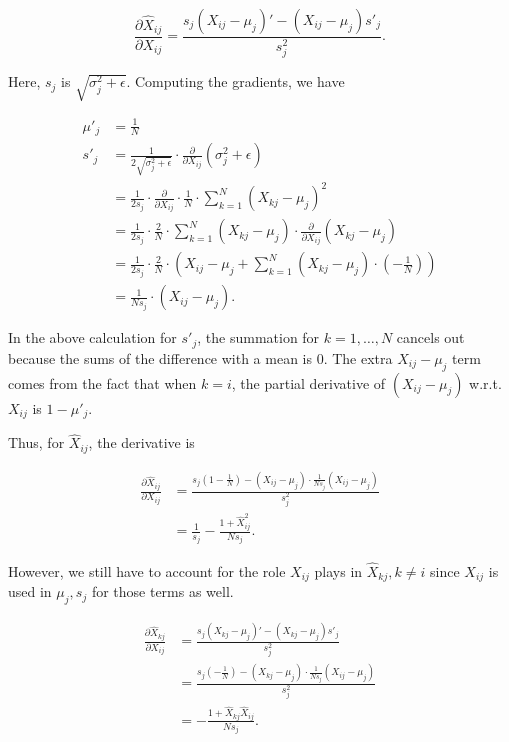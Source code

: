 \documentclass[answers]{exam}
\begin{document}
\begin{questions}
\begin{parts}
\begin{solution}
\[
\frac{\partial \hat{X}_{ij}}{\partial X_{ij}} = 
\frac{s_{j}(X_{ij}-\mu_{j})' - (X_{ij} - \mu_{j})s'_{j}}{s_{j}^2}
.\] 

Here, $s_{j}$ is $\sqrt{\sigma^2_{j} + \epsilon}$. Computing the gradients, 
we have

\begin{align*}
\mu'_{j} &= \frac{1}{N} \\ 
s'_{j} &= \frac{1}{2\sqrt{\sigma^2_{j}+\epsilon}} \cdot \frac{\partial}{\partial X_{ij}} (\sigma^2_{j} + \epsilon) \\ 
&= \frac{1}{2s_{j}} \cdot \frac{\partial}{\partial X_{ij}} \cdot \frac{1}{N} \cdot \sum_{k=1}^{N} (X_{kj} - \mu_{j})^2 \\
&= \frac{1}{2s_{j}} \cdot \frac{2}{N} \cdot \sum_{k=1}^{N} (X_{kj} - \mu_{j}) \cdot \frac{\partial}{\partial X_{ij}} (X_{kj}-\mu_{j}) \\
&= \frac{1}{2s_{j}} \cdot \frac{2}{N} \cdot \left( X_{ij} - \mu_{j} + \sum_{k=1}^{N} (X_{kj} - \mu_{j}) \cdot \left( -\frac{1}{N} \right) \right) \\
&= \frac{1}{Ns_{j}} \cdot \left( X_{ij} - \mu_{j}\right).
\end{align*}

In the above calculation for $s'_{j}$, the summation for $k=1,\ldots,N$ cancels
out because the sums of the difference with a mean is 0. The extra 
$X_{ij} - \mu_{j}$ term comes from the fact that when $k=i$, the partial
derivative of $(X_{ij} - \mu_{j})$ w.r.t. $X_{ij}$ is $1 - \mu'_{j}$.

Thus, for $\hat{X}_{ij}$, the derivative is 

\begin{align*}
\frac{\partial \hat{X}_{ij}}{\partial X_{ij}} &= 
\frac{s_{j}(1 - \frac{1}{N}) - (X_{ij} - \mu_{j}) \cdot \frac{1}{Ns_{j}} (X_{ij} - \mu_{j})}{s_{j}^2} \\
&= \frac{1}{s_{j}} - \frac{1 + \hat{X}_{ij}^2}{Ns_{j}}
.\end{align*}

However, we still have to account for the role $X_{ij}$ plays in $\hat{X}_{kj},
k\neq i$ since $ X_{ij}$ is used in $\mu_{j}, s_{j}$ for those terms as well.

\begin{align*}
\frac{\partial \hat{X}_{kj}}{\partial X_{ij}} &= \frac{s_{j}(X_{kj}-\mu_{j})' - (X_{kj} - \mu_{j})s'_{j}}{s_{j}^2} \\ 
&= \frac{s_{j}\left( -\frac{1}{N} \right) - (X_{kj}-\mu_{j}) \cdot \frac{1}{Ns_{j}}(X_{ij}-\mu_{j})}{s_{j}^2} \\
&= -\frac{1 + \hat{X}_{kj}\hat{X}_{ij}}{Ns_{j}}
.\end{align*}


\end{solution}
\end{parts}
\end{questions}
\end{document}
